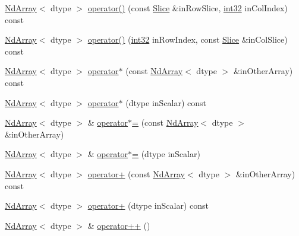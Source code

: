 \begin{DoxyCompactItemize}
\item 
\mbox{\hyperlink{class_num_c_1_1_nd_array}{Nd\+Array}}$<$ dtype $>$ \mbox{\hyperlink{class_num_c_1_1_nd_array_abc89e90ee2777842c911f640c8d86228}{operator()}} (const \mbox{\hyperlink{class_num_c_1_1_slice}{Slice}} \&in\+Row\+Slice, \mbox{\hyperlink{namespace_num_c_aa5a7e69266097d55816d4cdb19542b53}{int32}} in\+Col\+Index) const
\item 
\mbox{\hyperlink{class_num_c_1_1_nd_array}{Nd\+Array}}$<$ dtype $>$ \mbox{\hyperlink{class_num_c_1_1_nd_array_a6f395ba86e934cc3291c6dbb1f89c13e}{operator()}} (\mbox{\hyperlink{namespace_num_c_aa5a7e69266097d55816d4cdb19542b53}{int32}} in\+Row\+Index, const \mbox{\hyperlink{class_num_c_1_1_slice}{Slice}} \&in\+Col\+Slice) const
\item 
\mbox{\hyperlink{class_num_c_1_1_nd_array}{Nd\+Array}}$<$ dtype $>$ \mbox{\hyperlink{class_num_c_1_1_nd_array_a7c3d42b830320dfd322e71757cb7e001}{operator$\ast$}} (const \mbox{\hyperlink{class_num_c_1_1_nd_array}{Nd\+Array}}$<$ dtype $>$ \&in\+Other\+Array) const
\item 
\mbox{\hyperlink{class_num_c_1_1_nd_array}{Nd\+Array}}$<$ dtype $>$ \mbox{\hyperlink{class_num_c_1_1_nd_array_acc8e2a1e0ed7f63df71b4e1137bd0edd}{operator$\ast$}} (dtype in\+Scalar) const
\item 
\mbox{\hyperlink{class_num_c_1_1_nd_array}{Nd\+Array}}$<$ dtype $>$ \& \mbox{\hyperlink{class_num_c_1_1_nd_array_ad3aafa9b18db12bf67f9f1e1795a6043}{operator$\ast$=}} (const \mbox{\hyperlink{class_num_c_1_1_nd_array}{Nd\+Array}}$<$ dtype $>$ \&in\+Other\+Array)
\item 
\mbox{\hyperlink{class_num_c_1_1_nd_array}{Nd\+Array}}$<$ dtype $>$ \& \mbox{\hyperlink{class_num_c_1_1_nd_array_ac6da3d583de0971629230e8d612dacb5}{operator$\ast$=}} (dtype in\+Scalar)
\item 
\mbox{\hyperlink{class_num_c_1_1_nd_array}{Nd\+Array}}$<$ dtype $>$ \mbox{\hyperlink{class_num_c_1_1_nd_array_a910f4bbf7dc623d98a633c9490eb83c1}{operator+}} (const \mbox{\hyperlink{class_num_c_1_1_nd_array}{Nd\+Array}}$<$ dtype $>$ \&in\+Other\+Array) const
\item 
\mbox{\hyperlink{class_num_c_1_1_nd_array}{Nd\+Array}}$<$ dtype $>$ \mbox{\hyperlink{class_num_c_1_1_nd_array_afebba69128d3f3b5f72de7e4c952f4d5}{operator+}} (dtype in\+Scalar) const
\item 
\mbox{\hyperlink{class_num_c_1_1_nd_array}{Nd\+Array}}$<$ dtype $>$ \& \mbox{\hyperlink{class_num_c_1_1_nd_array_ac3973c61bcd5933d28b186c97a455e8d}{operator++}} ()
\item 

\end{DoxyCompactItemize}
